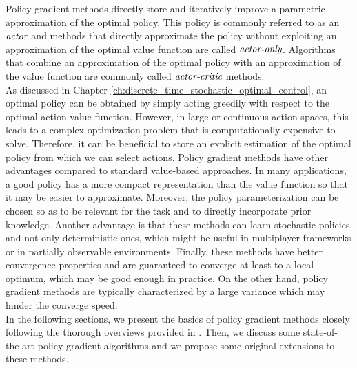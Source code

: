 Policy gradient methods directly store and iteratively improve a parametric approximation of the optimal policy. This policy is commonly referred to as an $\emph{actor}$ and methods that directly approximate the policy without exploiting an approximation of the optimal value function are called $\emph{actor-only}$. Algorithms that combine an approximation of the optimal policy with an approximation of the value function are commonly called $\emph{actor-critic}$ methods.\\
As discussed in Chapter \ref{ch:discrete_time_stochastic_optimal_control}, an optimal policy can be obtained by simply acting greedily with respect to the optimal action-value function. However, in large or continuous action spaces, this leads to a complex optimization problem that is computationally expensive to solve. Therefore, it can be beneficial to store an explicit estimation of the optimal policy from which we can select actions. Policy gradient methods have other advantages compared to standard value-based approaches. In many applications, a good policy has a more compact		representation than the value function so that it may be easier to approximate. Moreover, the policy parameterization can be chosen so as to be relevant for the task and to directly incorporate prior knowledge. Another advantage is that these methods can learn stochastic policies and not only deterministic ones, which might be useful in multiplayer frameworks or in partially observable environments. Finally, these methods have better convergence properties and are guaranteed to converge at least to a local optimum, which may be good enough in practice. On the other hand, policy gradient methods are typically characterized by a large variance which may hinder the converge speed.\\
In the following sections, we present the basics of policy gradient methods closely following the thorough overviews provided in \cite{peters2008reinforcement}. Then, we discuss some state-of-the-art policy gradient algorithms and we propose some original extensions to these methods. 

